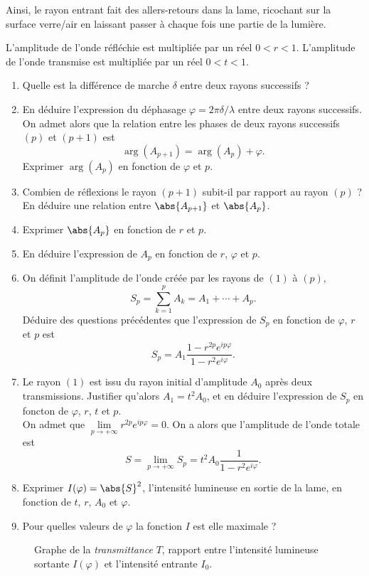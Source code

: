 \documentclass{article}
\renewcommand{\phi}{\varphi}
\begin{document}
Ainsi, le rayon entrant fait des allers-retours dans la lame, ricochant sur la surface verre/air en laissant passer à chaque fois une partie de la lumière.

L'amplitude de l'onde réfléchie est multipliée par un réel $0 < r < 1$. L'amplitude de l'onde transmise est multipliée par un réel $0< t < 1$.

\begin{enumerate}
	\item Quelle est la différence de marche $\delta$ entre deux rayons successifs ?
	\item En déduire l'expression du déphasage $\phi = 2\pi\delta/\lambda$ entre deux rayons successifs.
	\\
	On admet alors que la relation entre les phases de deux rayons successifs $(p)$ et $(p+1)$ est
	\[ \arg(A_{p+1}) = \arg(A_p) + \phi. \]
	Exprimer $\arg(A_p)$ en fonction de $\phi$ et $p$.
	\item Combien de réflexions le rayon $(p+1)$ subit-il par rapport au rayon $(p)$ ? En déduire une relation entre $\abs{A_{p+1}}$ et $\abs{A_p}$.
	\item Exprimer $\abs{A_p}$ en fonction de $r$ et $p$.
	\item En déduire l'expression de $A_p$ en fonction de $r$, $\phi$ et $p$.
	\item On définit l'amplitude de l'onde créée par les rayons de $(1)$ à $(p)$,
		\[ S_p = \sum_{k=1}^{p}A_k = A_1 + \cdots + A_p. \]
	Déduire des questions précédentes que l'expression de $S_p$ en fonction de $\phi$, $r$ et $p$ est
		\[ S_p = A_1\frac{1-r^{2p}e^{ip\phi}}{1-r^2e^{i\phi}}. \]
	\item Le rayon $(1)$ est issu du rayon initial d'amplitude $A_0$ après deux transmissions. Justifier qu'alors $A_1 = t^2A_0$, et en déduire l'expression de $S_p$ en foncton de $\phi$, $r$, $t$ et $p$.
	\\
	On admet que $\lim\limits_{p\to+\infty}r^{2p}e^{ip\phi} = 0$. On a alors que l'amplitude de l'onde totale est
		\[ S = \lim_{p\to+\infty}S_p = t^2A_0\frac{1}{1-r^2e^{i\phi}}. \]
	\item Exprimer $I(\phi) = \abs{S}^2$, l'intensité lumineuse en sortie de la lame, en fonction de $t$, $r$, $A_0$ et $\phi$.
	\item Pour quelles valeurs de $\phi$ la fonction $I$ est elle maximale ?
\end{enumerate}

\begin{figure}
	\centering
	\caption{Graphe de la \textit{transmittance} $T$, rapport entre l'intensité lumineuse sortante $I(\phi)$ et l'intensité entrante $I_0$.}
\end{figure}
\end{document}
